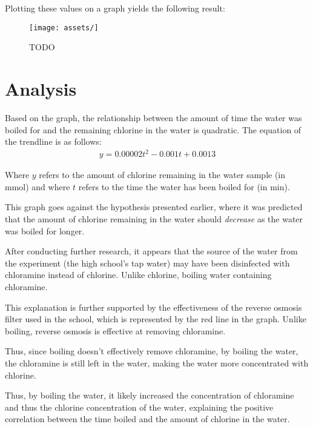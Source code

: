 \documentclass[12pt, demo]{article}
\begin{document}
Plotting these values on a graph yields the following result:

\begin{figure}[H]
	\centering
	\caption{TODO}
	\texttt{[image: assets/]}
\end{figure}

\section*{Analysis}

Based on the graph, the relationship between the amount of time the water was boiled for and the remaining chlorine in the water is quadratic. The equation of the trendline is as follows:
%
\begin{align*}
	y = 0.00002t^2 - 0.001t + 0.0013
\end{align*}

Where $y$ refers to the amount of chlorine remaining in the water sample (in \si{\mmol}) and where $t$ refers to the time the water has been boiled for (in \si{\minute}).

This graph goes against the hypothesis presented earlier, where it was predicted that the amount of chlorine remaining in the water should \textit{decrease} as the water was boiled for longer.

After conducting further research, it appears that the source of the water from the experiment (the high school's tap water) may have been disinfected with chloramine instead of chlorine. Unlike chlorine, boiling water containing chloramine.

This explanation is further supported by the effectiveness of the reverse osmosis filter used in the school, which is represented by the red line in the graph. Unlike boiling, reverse osmosis is effective at removing chloramine.

Thus, since boiling doesn't effectively remove chloramine, by boiling the water, the chloramine is still left in the water, making the water more concentrated with chlorine.

Thus, by boiling the water, it likely increased the concentration of chloramine and thus the chlorine concentration of the water, explaining the positive correlation between the time boiled and the amount of chlorine in the water.


\end{document}
